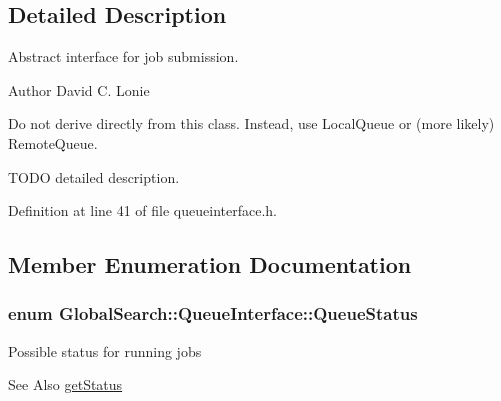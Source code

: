 \subsection{Detailed Description}
Abstract interface for job submission. 

\begin{DoxyAuthor}{Author}
David C. Lonie
\end{DoxyAuthor}
Do not derive directly from this class. Instead, use Local\-Queue or (more likely) Remote\-Queue.

T\-O\-D\-O detailed description. 

Definition at line 41 of file queueinterface.\-h.



\subsection{Member Enumeration Documentation}
\hypertarget{classGlobalSearch_1_1QueueInterface_a08dcf06d1b99f6333472470490ca9a6d}{
\subsubsection[{Queue\-Status}]{\setlength{\rightskip}{0pt plus 5cm}enum {\bf Global\-Search\-::\-Queue\-Interface\-::\-Queue\-Status}}}\label{classGlobalSearch_1_1QueueInterface_a08dcf06d1b99f6333472470490ca9a6d}
Possible status for running jobs \begin{DoxySeeAlso}{See Also}
\hyperlink{classGlobalSearch_1_1QueueInterface_a8294808ad1612f2b6fccd932a9d7fd35}{get\-Status} 
\end{DoxySeeAlso}

